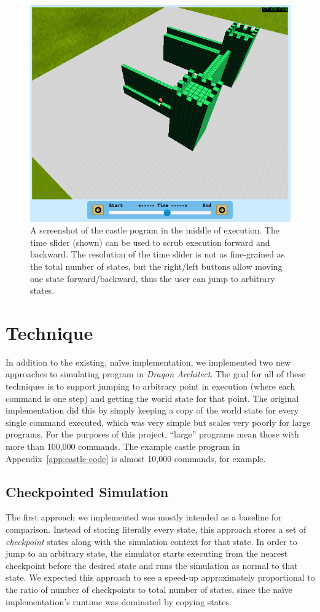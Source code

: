 \documentclass{sig-alternate}
\newcommand{\da}{\emph{Dragon Architect}}
\begin{document}
\begin{figure}[ht!]
  \centering
  \includegraphics[width=0.9\columnwidth]{images/castle-time-slider}
  \caption{A screenshot of the castle pogram in the middle of execution. The time slider (shown) can be used to scrub execution forward and backward. The resolution of the time slider is not as fine-grained as the total number of states, but the right/left buttons allow moving one state forward/backward, thus the user can jump to arbitrary states.}
  \label{fig:time-slider}
\end{figure}

\section{Technique} 

In addition to the existing, na\"{i}ve implementation, we implemented two new approaches to simulating program in \da. The goal for all of these techniques is to support jumping to arbitrary point in execution (where each command is one step) and getting the world state for that point. The original implementation did this by simply keeping a copy of the world state for every single command executed, which was very simple but scales very poorly for large programs. For the purposes of this project, ``large'' programs mean those with more than 100,000 commands. The example castle program in Appendix~\ref{app:castle-code} is almost 10,000 commands, for example.

\subsection{Checkpointed Simulation}
The first approach we implemented was mostly intended as a baseline for comparison. Instead of storing literally every state, this approach stores a set of \emph{checkpoint} states along with the simulation context for that state. In order to jump to an arbitrary state, the simulator starts executing from the nearest checkpoint before the desired state and runs the simulation as normal to that state. We expected this approach to see a speed-up approximately proportional to the ratio of number of checkpoints to total number of states, since the na\"{i}ve implementation's runtime was dominated by copying states.
\end{document}
